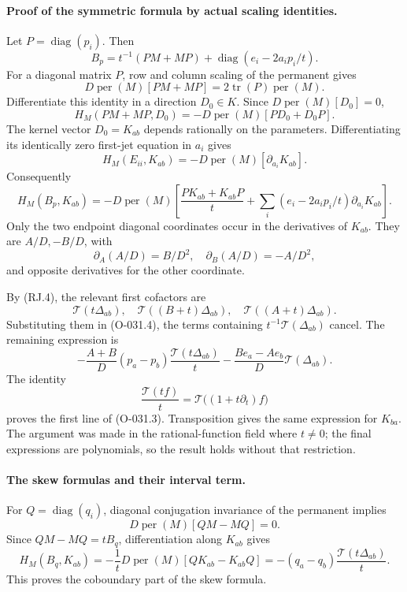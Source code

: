\paragraph{Proof of the symmetric formula by actual scaling identities.}
Let \(P=\operatorname{diag}(p_i)\). Then
\[
 B_p=t^{-1}(PM+MP)
             +\operatorname{diag}(e_i-2a_ip_i/t).
\]
For a diagonal matrix \(P\), row and column scaling of
the permanent gives
\[
 D\operatorname{per}(M)[PM+MP]
                           =2\operatorname{tr}(P)\operatorname{per}(M).
\]
Differentiate this identity in a direction \(D_0\in K\).
Since \(D\operatorname{per}(M)[D_0]=0\),
\[
 H_M(PM+MP,D_0)
                       =-D\operatorname{per}(M)[PD_0+D_0P].
\]
The kernel vector \(D_0=K_{ab}\) depends rationally on
the parameters. Differentiating its identically zero
first-jet equation in \(a_i\) gives
\[
 H_M(E_{ii},K_{ab})
                     =-D\operatorname{per}(M)[\partial_{a_i}K_{ab}].
\]
Consequently
\[
 H_M(B_p,K_{ab})
 =-D\operatorname{per}(M)\left[
       \frac{PK_{ab}+K_{ab}P}{t}
        +\sum_i(e_i-2a_ip_i/t)\partial_{a_i}K_{ab}\right].
                                                               \tag{O-031.4}
\]
Only the two endpoint diagonal coordinates occur in
the derivatives of \(K_{ab}\).
They are \(A/D,-B/D\), with
\[
 \partial_A(A/D)=B/D^2,\quad
 \partial_B(A/D)=-A/D^2,
\]
and opposite derivatives for the other coordinate.

By (RJ.4), the relevant first cofactors are
\[
 \mathcal T(t\Delta_{ab}),\quad
 \mathcal T((B+t)\Delta_{ab}),\quad
 \mathcal T((A+t)\Delta_{ab}).
\]
Substituting them in (O-031.4), the terms containing
\(t^{-1}\mathcal T(\Delta_{ab})\) cancel.
The remaining expression is
\[
 -\frac{A+B}{D}(p_a-p_b)
                \frac{\mathcal T(t\Delta_{ab})}{t}
       -\frac{B e_a-A e_b}{D}\mathcal T(\Delta_{ab}).
\]
The identity
\[
 \frac{\mathcal T(tf)}{t}
                       =\mathcal T\bigl((1+t\partial_t)f\bigr)
\]
proves the first line of (O-031.3). Transposition gives
the same expression for \(K_{ba}\).
The argument was made in the rational-function field
where \(t\ne0\); the final expressions are polynomials,
so the result holds without that restriction.

\paragraph{The skew formulas and their interval term.}
For \(Q=\operatorname{diag}(q_i)\), diagonal conjugation
invariance of the permanent implies
\[
 D\operatorname{per}(M)[QM-MQ]=0.
\]
Since \(QM-MQ=tB_q\), differentiation along \(K_{ab}\)
gives
\[
 H_M(B_q,K_{ab})
     =-\frac1tD\operatorname{per}(M)[QK_{ab}-K_{ab}Q]
     =-(q_a-q_b)\frac{\mathcal T(t\Delta_{ab})}{t}.
\]
This proves the coboundary part of the skew formula.

